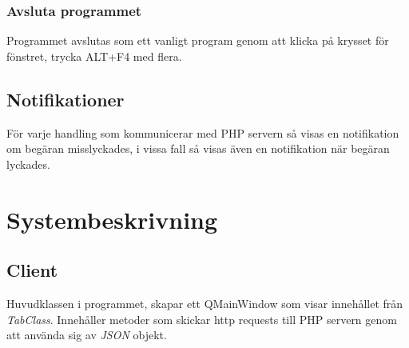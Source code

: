 \documentclass[11pt, titlepage, oneside, a4paper]{article}
\newcommand{\Section}[1]{\section{#1}\vspace{-8pt}}
\newcommand{\Subsection}[1]{\vspace{-4pt}\subsection{#1}\vspace{-8pt}}
\newcommand{\Subsubsection}[1]{\vspace{-4pt}\subsubsection{#1}\vspace{-8pt}}
\begin{document}
        \newpage
        \Subsubsection{Avsluta programmet}
        Programmet avslutas som ett vanligt program genom att klicka på krysset för fönstret, trycka ALT+F4 med flera.
        
        \Subsection{Notifikationer}
        För varje handling som kommunicerar med PHP servern så visas en notifikation om begäran misslyckades, i vissa fall så visas även en notifikation när begäran lyckades.
        
        
        
		\Section{Systembeskrivning}
        \Subsection{Client}
        Huvudklassen i programmet, skapar ett QMainWindow som visar innehållet från \emph{TabClass}.
        Innehåller metoder som skickar http requests till PHP servern genom att använda sig av
        \emph{JSON} objekt. 
        
\end{document}

